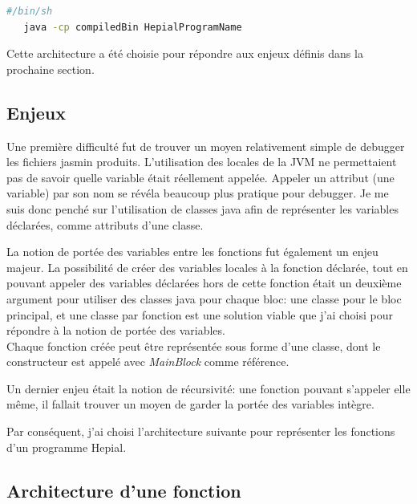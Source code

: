 \documentclass[11pt,a4paper]{article}
\begin{document}
  \newpage
  
  \begin{lstlisting}[language=bash,caption={Exécutable programme Hepial}]
   #/bin/sh
   java -cp compiledBin HepialProgramName
   \end{lstlisting}    
  
  \par Cette architecture a été choisie pour répondre aux enjeux définis dans la prochaine section. 
  
  \subsection{Enjeux}
  
  \par Une première difficulté fut de trouver un moyen relativement simple de debugger les fichiers jasmin produits. L'utilisation des locales de la JVM ne permettaient pas de savoir quelle variable était réellement appelée. Appeler un attribut (une variable) par son nom se révéla beaucoup plus pratique pour debugger. Je me suis donc penché sur l'utilisation de classes java afin de représenter les variables déclarées, comme attributs d'une classe. 
  
  \par La notion de portée des variables entre les fonctions fut également un enjeu majeur. La possibilité de créer des variables locales à la fonction déclarée, tout en pouvant appeler des variables déclarées hors de cette fonction était un deuxième argument pour utiliser des classes java pour chaque bloc: une classe pour le bloc principal, et une classe par fonction est une solution viable que j'ai choisi pour répondre à la notion de portée des variables. \\
  Chaque fonction créée peut être représentée sous forme d'une classe, dont le constructeur est appelé avec \textit{MainBlock} comme référence. 
  
  \par Un dernier enjeu était la notion de récursivité: une fonction pouvant s'appeler elle même, il fallait trouver un moyen de garder la portée des variables intègre. 
  
  \par Par conséquent, j'ai choisi l'architecture suivante pour représenter les fonctions d'un programme Hepial.  
  
  \subsection{Architecture d'une fonction}
  
\end{document}
